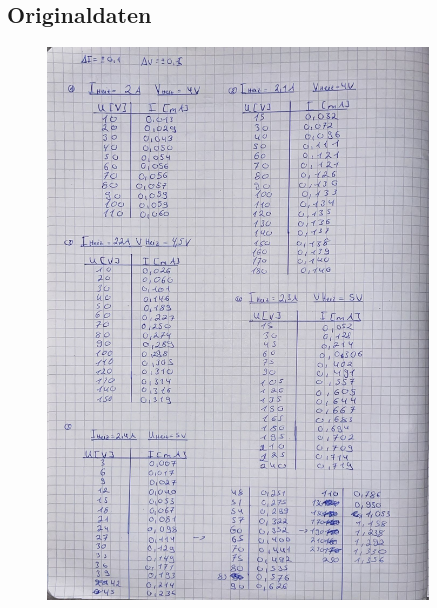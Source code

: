\subsection{Originaldaten}
%
\begin{figure}[H]
  \centering
  \includegraphics[width=0.90\textwidth]{content/Bilder/Originaldaten_1.jpeg}
  \label{fig:Messungen_1}
\end{figure}
